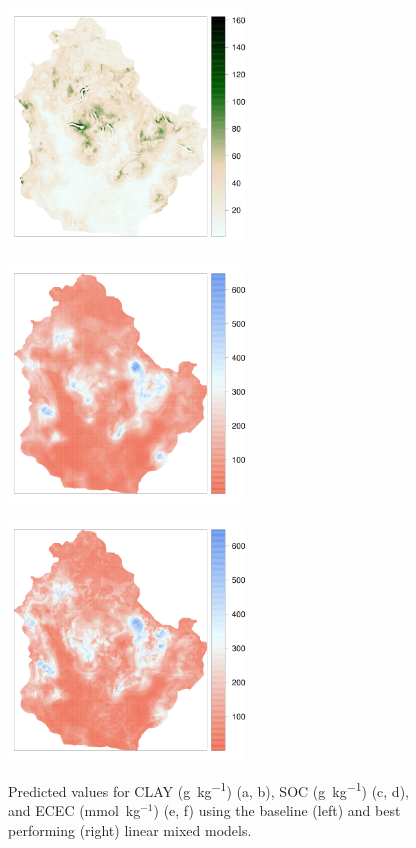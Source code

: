 \begin{figure}[!ht]
\begin{minipage}[b]{63mm}
    \end{minipage}
    \begin{minipage}[b]{63mm}
      \subcaption{}
      \label{fig:soc-best-pred}
      \centering
      \includegraphics[width=63mm]{chap01FIG7e}
    \end{minipage}
    \begin{minipage}[b]{63mm}
      \subcaption{}
      \label{fig:ecec-base-pred}
      \centering
      \includegraphics[width=63mm]{chap01FIG7c}
    \end{minipage}
    \begin{minipage}[b]{63mm}
      \subcaption{}
      \label{fig:ecec-best-pred}
      \centering
      \includegraphics[width=63mm]{chap01FIG7f}
    \end{minipage}
  \caption{Predicted values for CLAY (\si{\gram\per\kilo\gram}) (a, b), SOC (\si{\gram\per\kilo\gram}) (c, d), 
and ECEC (mmol~kg$^{-1}$) (e, f) using the baseline (left) and best performing (right) linear mixed models.}
  \label{fig:kriging}
\end{figure}

